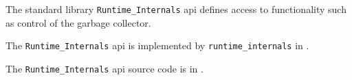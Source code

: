 
The standard library {\tt Runtime\_Internals} api defines access to functionality 
such as control of the garbage collector.

The {\tt Runtime\_Internals} api is implemented by  
{\tt runtime\_internals} in 
.

The {\tt Runtime\_Internals} api source code is in .





